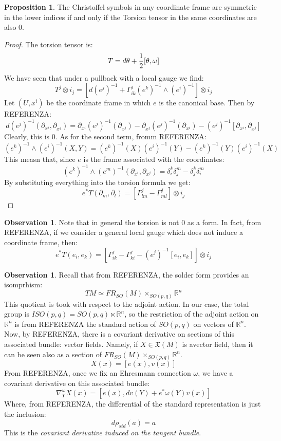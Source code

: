 \documentclass[12pt,a4paper]{report}
\theoremstyle{definition}
\theoremstyle{Theorem}
\newtheorem{Prop}[Def]{Proposition}
\theoremstyle{definition}
\theoremstyle{definition}
\newtheorem{Obs}[Def]{Observation}
\begin{document}
		\begin{Prop}
			The Christoffel symbols in any coordinate frame are symmetric in the lower indices if and only if the Torsion tensor in the same coordinates are also 0.
		\end{Prop}
		\begin{proof}
			The torsion tensor is:
			$$T=d\theta+{1\over 2}[\theta,\omega]$$
			We have seen that under a pullback with a local gauge we find:
			$$T^j\otimes i_j=[d(e^j)^{-1}+ \Gamma^j_{ik}(e^k)^{-1}\wedge (e^i)^{-1}]\otimes i_j$$
			Let $(U,x^i)$ be the coordinate frame in which $e$ is the canonical base. Then by REFERENZA:
			$$d(e^j)^{-1}(\partial_{x^i},\partial_{x^j})=\partial_{x^i}(e^j)^{-1}(\partial_{x^j})-\partial_{x^j}(e^j)^{-1}(\partial_{x^i})-(e^j)^{-1}[\partial_{x^i},\partial_{x^j}]$$
			Clearly, this is 0. As for the second term, fromm REFERENZA:
			$$(e^k)^{-1}\wedge (e^i)^{-1}(X,Y)=(e^k)^{-1}(X) (e^i)^{-1}(Y)-(e^k)^{-1}(Y) (e^i)^{-1}(X)$$
			This measn that, since $e$ is the frame associated with the coordinates:
			$$(e^k)^{-1}\wedge (e^m)^{-1}(\partial_{x^i},\partial_{x^j})=\delta^k_i\delta^m_j-\delta^k_j\delta^m_i$$
			By substituting everything into the torsion formula we get:
			$$e^*T(\partial_m,\partial_l)=[\Gamma^j_{lm}-\Gamma^j_{ml}]\otimes i_j$$
		\end{proof}
		\begin{Obs}
			Note that in general the torsion is not 0 as a form. In fact, from REFERENZA, if we consider a general local gauge which does not induce a coordinate frame, then:
			$$e^*T(e_i,e_k)=[\Gamma^j_{ik}-\Gamma^j_{ki}-(e^j)^{-1}[e_i,e_k]]\otimes i_j$$
		\end{Obs}
		\begin{Obs}
			Recall that from REFERENZA, the solder form provides an isomprhism:
			$$TM\simeq FR_{SO}(M)\times_{SO(p,q)} \mathbb{R}^n$$
			This quotient is took with respect to the adjoint action. 
			In our case, the total group is $ISO(p,q)=SO(p,q)\ltimes \mathbb{R}^n$, so the restriction of the adjoint action on $\mathbb{R}^n$ is from REFERENZA the standard action of $SO(p,q)$ on vectors of $\mathbb{R}^n$.\\
			Now, by REFERENZA, there is a covariant derivative on sections of this associated bundle: vector fields. Namely, if $X\in\mathfrak{X}(M)$ is  avector field, then it can be seen also as a section of $FR_{SO}(M)\times_{SO(p,q)} \mathbb{R}^n$.
			$$X(x)=[e(x),v(x)]$$
			From REFERENZA, once we fix an Ehresmann connection $\omega$, we have a covariant derivative on this associated bundle:
			$$\nabla_Y^\omega X(x)=[e(x),dv(Y)+e^*\omega(Y)v(x)]$$
			Where, from REFERENZA, the differential of the standard representation is just the inclusion:
			$$d\rho_{std}(a)=a$$
			This is the \textit{covariant derivative induced on the tangent bundle}.
		\end{Obs}
\end{document}
